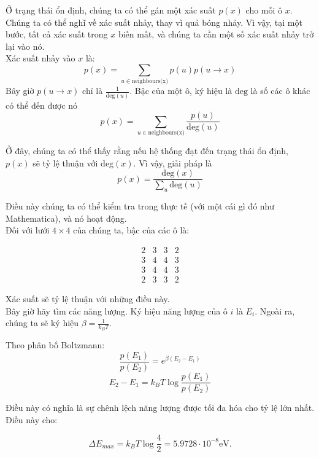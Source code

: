 \begin{solution}
Ở trạng thái ổn định, chúng ta có thể gán một xác suất $p(x)$ cho mỗi ô $x$.
Chúng ta có thể nghĩ về xác suất nhảy, thay vì quả bóng nhảy.
Vì vậy, tại một bước, tất cả xác suất trong $x$ biến mất, và chúng ta cần một số xác suất nhảy trở lại vào nó.\\

Xác suất nhảy vào $x$ là:
\begin{equation*}
    p(x) = \sum_{u \in \text{neighbours(x)}} p(u)p(u \rightarrow x)   
\end{equation*}
Bây giờ $p(u\rightarrow x)$ chỉ là $\frac{1}{\text{deg}(u)}$. Bậc của một ô, ký hiệu là $\text{deg}$ là số
các ô khác có thể đến được nó
\begin{equation*}
    p(x) = \sum_{u \in \text{neighbours(x)}} \frac{p(u)}{\text{deg}(u)}  
\end{equation*}

Ở đây, chúng ta có thể thấy rằng nếu hệ thống đạt đến trạng thái ổn định, $p(x)$ sẽ tỷ lệ thuận với $\text{deg}(x)$.
Vì vậy, giải pháp là 
\begin{equation*}
    p(x) = \frac{\text{deg}(x)}{\sum_u \text{deg}(u)}
\end{equation*}

Điều này chúng ta có thể kiểm tra trong thực tế (với một cái gì đó như Mathematica), và nó hoạt động.
\\

Đối với lưới $4 \times 4$ của chúng ta, bậc của các ô là:

\[
\begin{matrix}
2 & 3 & 3 & 2 \\
3 & 4 & 4 & 3 \\
3 & 4 & 4 & 3 \\
2 & 3 & 3 & 2
\end{matrix}
\]

Xác suất sẽ tỷ lệ thuận với những điều này.\\

Bây giờ hãy tìm các năng lượng. Ký hiệu năng lượng của ô $i$ là $E_i$. Ngoài ra, chúng ta sẽ ký hiệu $\beta = \frac{1}{k_B T}$. 


Theo phân bố Boltzmann:
\[
\frac{p(E_1)}{p(E_2)} = e^{\beta(E_2 - E_1)}
\]
\[
E_2 - E_1 = k_B T \log{\frac{p(E_1)}{p(E_2)}}
\]

Điều này có nghĩa là sự chênh lệch năng lượng được tối đa hóa cho tỷ lệ lớn nhất. Điều này cho:

\[
\Delta E_{max} = k_B T \log{\frac{4}{2}} = \boxed{5.9728 \cdot 10 ^ {-8}\mathrm{eV}.}
\]



\end{solution}
